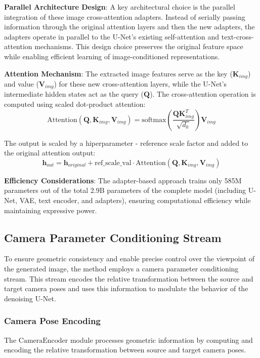 \textbf{Parallel Architecture Design}: A key architectural choice is the parallel integration of these image cross-attention adapters. Instead of serially passing information through the original attention layers and then the new adapters, the adapters operate in parallel to the U-Net's existing self-attention and text-cross-attention mechanisms. This design choice preserves the original feature space while enabling efficient learning of image-conditioned representations.

\textbf{Attention Mechanism}: The extracted image features serve as the key ($\mathbf{K}_{img}$) and value ($\mathbf{V}_{img}$) for these new cross-attention layers, while the U-Net's intermediate hidden states act as the query ($\mathbf{Q}$). The cross-attention operation is computed using scaled dot-product attention:
\[ \text{Attention}(\mathbf{Q}, \mathbf{K}_{img}, \mathbf{V}_{img}) = \text{softmax}\left(\frac{\mathbf{Q}\mathbf{K}_{img}^T}{\sqrt{d_k}}\right)\mathbf{V}_{img} \]

The output is scaled by a hiperparameter - reference scale factor and added to the original attention output:
\[ \mathbf{h}_{out} = \mathbf{h}_{original} + \text{ref\_scale\_val} \cdot \text{Attention}(\mathbf{Q}, \mathbf{K}_{img}, \mathbf{V}_{img}) \]

\textbf{Efficiency Considerations}: The adapter-based approach trains only 585M parameters out of the total 2.9B parameters of the complete model (including U-Net, VAE, text encoder, and adapters), ensuring computational efficiency while maintaining expressive power.

\subsection{Camera Parameter Conditioning Stream}
To ensure geometric consistency and enable precise control over the viewpoint of the generated image, the method employs a camera parameter conditioning stream. This stream encodes the relative transformation between the source and target camera poses and uses this information to modulate the behavior of the denoising U-Net.

\subsubsection{Camera Pose Encoding}
The $\text{CameraEncoder}$ module processes geometric information by computing and encoding the relative transformation between source and target camera poses.


